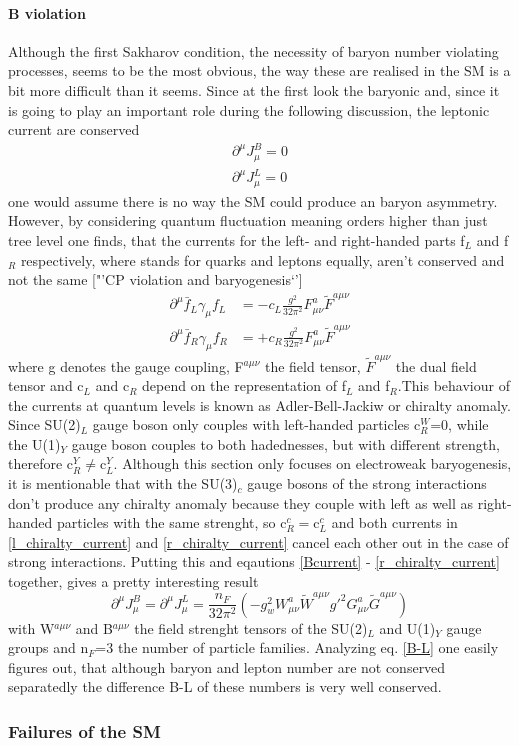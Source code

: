 \paragraph{B violation}
Although the first Sakharov condition, the necessity of baryon number violating processes, seems to be the most obvious, the way these are realised in the SM is a bit more difficult than it seems. \newline
Since at the first look the baryonic and, since it is going to play an important role during the following discussion, the leptonic current are  conserved
\begin{align}
	\partial^\mu J_\mu^B=0
	\label{Bcurrent}
	\\
	\partial^\mu J_\mu^L=0
	\label{Lcurrent}
\end{align}
one would assume there is no way the SM could produce an baryon asymmetry. However, by considering quantum fluctuation meaning orders higher than just tree level one finds, that the currents for the left- and right-handed parts f$_L$ and f$_R$ respectively, where stands for quarks and leptons equally, aren't conserved and not the same ["'CP violation and baryogenesis`']
\begin{align}
	\partial^\mu\bar{f}_L\gamma_\mu f_L&=-c_L\frac{g^2}{32\pi^2}F^a_{\mu\nu}\tilde{F}^{a\mu\nu}
	\label{l_chiralty_current}
	\\
	\partial^\mu\bar{f}_R\gamma_\mu f_R&=+c_R\frac{g^2}{32\pi^2}F^a_{\mu\nu}\tilde{F}^{a\mu\nu}
	\label{r_chiralty_current}
\end{align}
where g denotes the gauge coupling, F$^{a\mu\nu}$ the field tensor, $\tilde{F}^{a\mu\nu}$ the dual field tensor and c$_L$ and c$_R$ depend on the representation of f$_L$ and f$_R$.This behaviour of the currents at quantum levels is known as Adler-Bell-Jackiw or chiralty anomaly. 
Since SU(2)$_L$ gauge boson only couples with left-handed particles c$_R^W$=0, while the U(1)$_Y$ gauge boson couples to both hadednesses, but with different strength, therefore c$_R^Y\neq$c$_L^Y$. Although this section only focuses on electroweak baryogenesis, it is mentionable that with the SU(3)$_c$ gauge bosons of the strong interactions don't produce any chiralty anomaly because they couple with left as well as right-handed particles with the same strenght, so c$_R^c=$c$_L^c$ and both currents in \eqref{l_chiralty_current} and \eqref{r_chiralty_current} cancel each other out in the case of strong interactions. \newline
Putting this and eqautions \ref{Bcurrent} - \ref{r_chiralty_current} together, gives a pretty interesting result
\begin{equation}
\partial^\mu J_\mu^B=\partial^\mu J_\mu^L=\frac{n_F}{32\pi^2}\left(-g_w^2W^a_{\mu\nu}\tilde{W}^{a\mu\nu}g'^2G^a_{\mu\nu}\tilde{G}^{a\mu\nu}\right)
\label{B-L}
\end{equation}
with W$^{a\mu\nu}$ and B$^{a\mu\nu}$ the field strenght tensors of the SU(2)$_L$ and U(1)$_Y$ gauge groups and n$_F$=3 the number of particle families. \newline
Analyzing eq. \ref{B-L} one easily figures out, that although baryon and lepton number are not conserved separatedly the difference B-L of these numbers is very well conserved.
\subsubsection{Failures of the SM}

